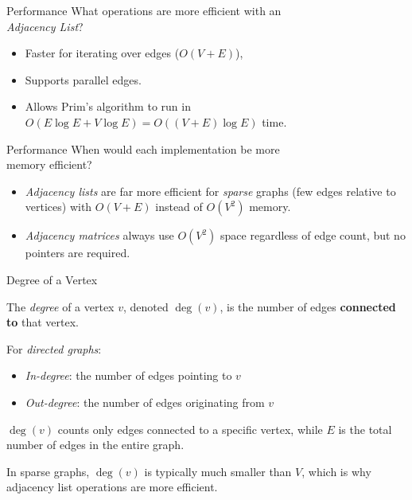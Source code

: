 \documentclass[14pt,aspectratio=1610]{beamer}
\begin{document}
\begin{frame}{Performance}
  \large
  What operations are more efficient with an\\
  \emph{ Adjacency List}?

  \pause{}
  \begin{itemize}
  \item
    Faster for iterating over edges (\(O(V+E)\)),
  \item
    Supports parallel edges.
  \item
    Allows Prim's algorithm to run in \(O(E \log{E} + V \log{E}) = O((V + E) \log{E})\) time.
  \end{itemize}
\end{frame}


\begin{frame}{Performance}
  \large
    When would each implementation be more\\ memory efficient?

    \pause{}
    \begin{itemize}
      \item
        \emph{Adjacency lists} are far more efficient for \textit{sparse} graphs (few edges relative to vertices) with \(O(V+E)\) instead of \(O(V^2)\) memory.
      \item
        \emph{Adjacency matrices} always use \(O(V^2)\) space regardless of edge count, but no pointers are required.
    \end{itemize}
\end{frame}

\begin{frame}{Degree of a Vertex}

  The \emph{degree} of a vertex \(v\), denoted \(\deg(v)\), is the number of edges \textbf{connected to} that vertex.

  For \emph{directed graphs}:
  \vspace{-\parskip}
  \begin{itemize}
    \item \emph{In-degree}: the number of edges pointing to \(v\)
    \item \emph{Out-degree}: the number of edges originating from \(v\)
  \end{itemize}


  
  \pause{}
  
  \(\deg(v)\) counts only edges connected to a specific vertex, while \(E\) is the total number of edges in the entire graph.
  
  In sparse graphs, \(\deg(v)\) is typically much smaller than \(V\), which is why adjacency list operations are more efficient.
\end{frame}
\end{document}
